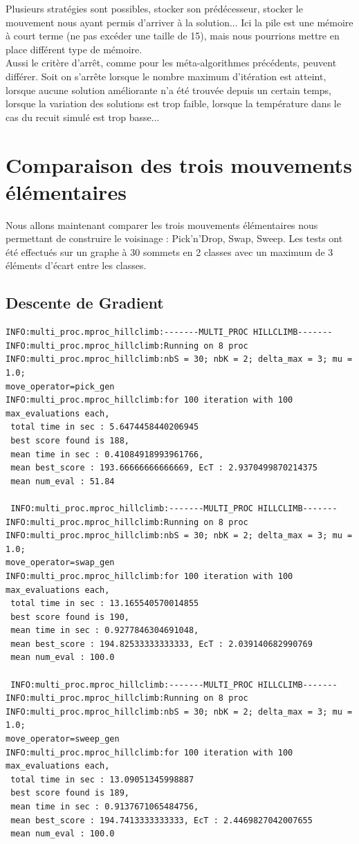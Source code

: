 \documentclass[a4paper]{article}
\begin{document}
Plusieurs stratégies sont possibles, stocker son prédécesseur, stocker le mouvement nous ayant permis d'arriver à la solution...
Ici la pile est une mémoire à court terme (ne pas excéder une taille de 15), mais nous pourrions mettre en place différent type de mémoire. \\

Aussi le critère d'arrêt, comme pour les méta-algorithmes précédents, peuvent différer. Soit on s'arrête lorsque le nombre maximum d'itération est atteint, lorsque aucune solution améliorante n'a été trouvée depuis un certain temps, lorsque la variation des solutions est trop faible, lorsque la température dans le cas du recuit simulé est trop basse...

\section{Comparaison des trois mouvements élémentaires}
Nous allons maintenant comparer les trois mouvements élémentaires nous permettant de construire le voisinage : Pick'n'Drop, Swap, Sweep.
Les tests ont été effectués sur un graphe à 30 sommets en 2 classes avec un maximum de 3 éléments d'écart entre les classes.
	\subsection{Descente de Gradient}
		\begin{verbatim}
INFO:multi_proc.mproc_hillclimb:-------MULTI_PROC HILLCLIMB-------
INFO:multi_proc.mproc_hillclimb:Running on 8 proc
INFO:multi_proc.mproc_hillclimb:nbS = 30; nbK = 2; delta_max = 3; mu = 1.0;
move_operator=pick_gen
INFO:multi_proc.mproc_hillclimb:for 100 iteration with 100 max_evaluations each, 
 total time in sec : 5.6474458440206945
 best score found is 188,
 mean time in sec : 0.41084918993961766,
 mean best_score : 193.66666666666669, EcT : 2.9370499870214375
 mean num_eval : 51.84

 INFO:multi_proc.mproc_hillclimb:-------MULTI_PROC HILLCLIMB-------
INFO:multi_proc.mproc_hillclimb:Running on 8 proc
INFO:multi_proc.mproc_hillclimb:nbS = 30; nbK = 2; delta_max = 3; mu = 1.0;
move_operator=swap_gen
INFO:multi_proc.mproc_hillclimb:for 100 iteration with 100 max_evaluations each, 
 total time in sec : 13.165540570014855
 best score found is 190,
 mean time in sec : 0.9277846304691048,
 mean best_score : 194.82533333333333, EcT : 2.039140682990769
 mean num_eval : 100.0

 INFO:multi_proc.mproc_hillclimb:-------MULTI_PROC HILLCLIMB-------
INFO:multi_proc.mproc_hillclimb:Running on 8 proc
INFO:multi_proc.mproc_hillclimb:nbS = 30; nbK = 2; delta_max = 3; mu = 1.0;
move_operator=sweep_gen
INFO:multi_proc.mproc_hillclimb:for 100 iteration with 100 max_evaluations each, 
 total time in sec : 13.09051345998887
 best score found is 189,
 mean time in sec : 0.9137671065484756,
 mean best_score : 194.7413333333333, EcT : 2.4469827042007655
 mean num_eval : 100.0
		\end{verbatim}
\end{document}
